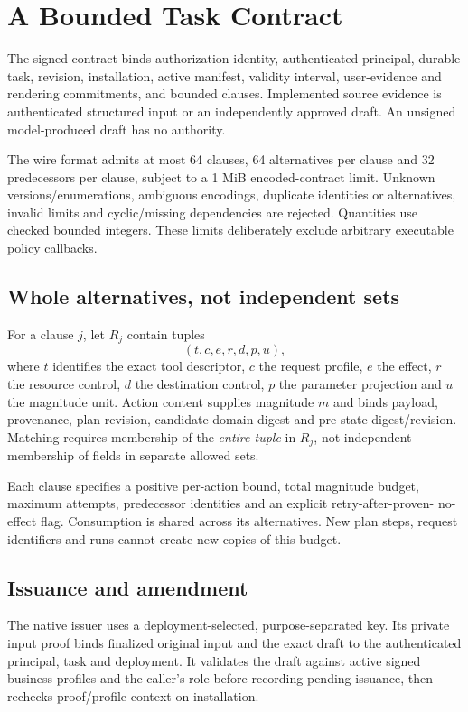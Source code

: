 \documentclass[letterpaper,twocolumn,10pt]{article}
\begin{document}
\section{A Bounded Task Contract}
\label{sec:contract}

The signed contract binds authorization identity, authenticated principal,
durable task, revision, installation, active manifest, validity interval,
user-evidence and rendering commitments, and bounded clauses. Implemented
source evidence is authenticated structured input or an independently approved
draft. An unsigned model-produced draft has no authority.

The wire format admits at most 64 clauses, 64 alternatives per clause and
32 predecessors per clause, subject to a 1 MiB encoded-contract limit.
Unknown versions/enumerations, ambiguous encodings, duplicate identities or
alternatives, invalid limits and cyclic/missing dependencies are rejected.
Quantities use checked bounded integers. These limits deliberately exclude
arbitrary executable policy callbacks.

\subsection{Whole alternatives, not independent sets}

For a clause $j$, let $R_j$ contain tuples
\[
  (t,c,e,r,d,p,u),
\]
where $t$ identifies the exact tool descriptor, $c$ the request profile,
$e$ the effect, $r$ the resource control, $d$ the destination control,
$p$ the parameter projection and $u$ the magnitude unit.
Action content supplies magnitude $m$ and binds payload, provenance, plan
revision, candidate-domain digest and pre-state digest/revision.
Matching requires membership of the \emph{entire tuple} in $R_j$, not independent
membership of fields in separate allowed sets.

Each clause specifies a positive per-action bound, total magnitude budget,
maximum attempts, predecessor identities and an explicit retry-after-proven-
no-effect flag. Consumption is shared across its alternatives. New plan steps,
request identifiers and runs cannot create new copies of this budget.

\subsection{Issuance and amendment}

The native issuer uses a deployment-selected, purpose-separated key.
Its private input proof binds finalized original input and the exact draft
to the authenticated principal, task and deployment. It validates the draft
against active signed business profiles and the caller's role before recording
pending issuance, then rechecks proof/profile context on installation.
\end{document}
